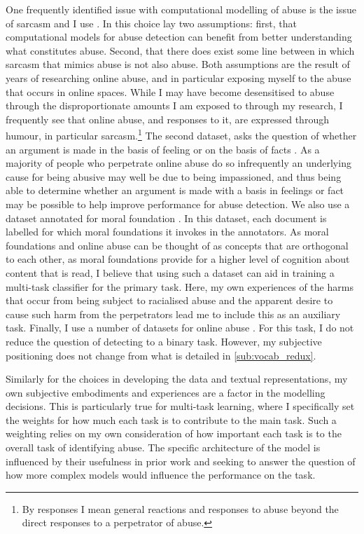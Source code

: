 {One frequently identified issue with computational modelling of abuse is the issue of sarcasm \citep{Rottger:2021} and I use \citet{Oraby:2016}. In this choice lay two assumptions: first, that computational models for abuse detection can benefit from better understanding what constitutes abuse. Second, that there does exist some line between in which sarcasm that mimics abuse is not also abuse. Both assumptions are the result of years of researching online abuse, and in particular exposing myself to the abuse that occurs in online spaces. While I may have become desensitised to abuse through the disproportionate amounts I am exposed to through my research, I frequently see that online abuse, and responses to it, are expressed through humour, in particular sarcasm.\footnote{By responses I mean general reactions and responses to abuse beyond the direct responses to a perpetrator of abuse.}
The second dataset, asks the question of whether an argument is made in the basis of feeling or on the basis of facts \citep{Oraby:2015}. As a majority of people who perpetrate online abuse do so infrequently \citep{Waseem-Hovy:2016} an underlying cause for being abusive may well be due to being impassioned, and thus being able to determine whether an argument is made with a basis in feelings or fact may be possible to help improve performance for abuse detection.
We also use a dataset annotated for moral foundation \citep{Hoover:2019}. In this dataset, each document is labelled for which moral foundations it invokes in the annotators. As moral foundations and online abuse can be thought of as concepts that are orthogonal to each other, as moral foundations provide for a higher level of cognition about content that is read, I believe that using such a dataset can aid in training a multi-task classifier for the primary task. Here, my own experiences of the harms that occur from being subject to racialised abuse and the apparent desire to cause such harm from the perpetrators lead me to include this as an auxiliary task.
Finally, I use a number of datasets for online abuse \citep{Garcia:2018,Waseem:2016,Waseem-Hovy:2016,Davidson:2017,Wulczyn:2016}. For this task, I do not reduce the question of detecting to a binary task. However, my subjective positioning does not change from what is detailed in \autoref{sub:vocab_redux}.

Similarly for the choices in developing the data and textual representations, my own subjective embodiments and experiences are a factor in the modelling decisions. This is particularly true for multi-task learning, where I specifically set the weights for how much each task is to contribute to the main task. Such a weighting relies on my own consideration of how important each task is to the overall task of identifying abuse. The specific architecture of the model is influenced by their usefulness in prior work \citep{Bingel:2018} and seeking to answer the question of how more complex models would influence the performance on the task.

}

